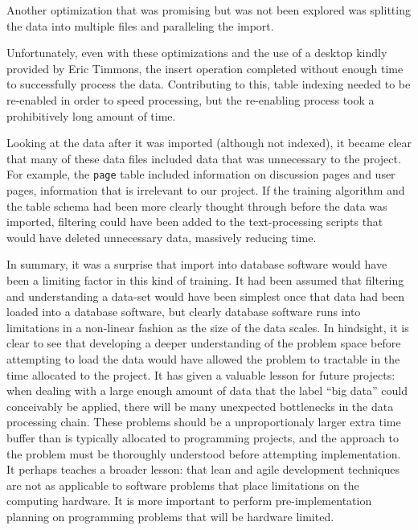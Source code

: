 \documentclass{article}
\begin{document}
Another optimization that was promising but was not been explored was splitting
the data into multiple files and paralleling the import.

Unfortunately, even with these optimizations and the use of a desktop kindly
provided by Eric Timmons, the insert operation completed without enough time to
successfully process the data.  Contributing to this, table indexing
needed to be re-enabled in order to speed processing, but the re-enabling
process took a prohibitively long amount of time.

Looking at the data after it was imported (although not indexed), it became
clear that many of these data files included data that was unnecessary to the
project.  For example, the \texttt{page} table included information on
discussion pages and user pages, information that is irrelevant to our project.
If the training algorithm and the table schema had been more clearly thought
through before the data was imported, filtering could have been added to the
text-processing scripts that would have deleted unnecessary data, massively
reducing time. 

In summary, it was a surprise that import into database software would have been
a limiting factor in this kind of training. It had been assumed that filtering
and understanding a data-set would have been simplest once that data had been
loaded into a database software, but clearly database software runs into
limitations in a non-linear fashion as the size of the data scales. In
hindsight, it is clear to see that developing a deeper understanding of the
problem space before attempting to load the data would have allowed the problem
to tractable in the time allocated to the project. It has given a valuable
lesson for future projects: when dealing with a large enough amount of data that
the label ``big data'' could conceivably be applied, there will be many
unexpected bottlenecks in the data processing chain. These problems should be a
unproportionaly larger extra time buffer than is typically allocated to
programming projects, and the approach to the problem must be thoroughly
understood before attempting implementation. It perhaps teaches a broader
lesson: that lean and agile development techniques are not as applicable to
software problems that place limitations on the computing hardware. It is more
important to perform pre-implementation planning on programming problems that
will be hardware limited.
\end{document}
